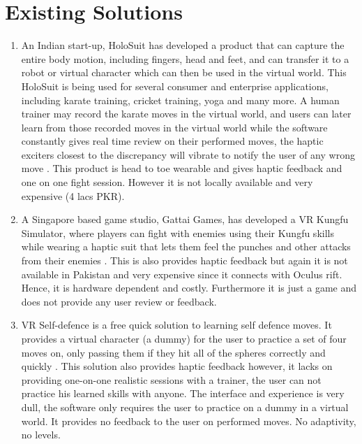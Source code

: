 \section{Existing Solutions}
\label{section:existingSolutions}
\begin{enumerate}
    \item An Indian start-up, HoloSuit has developed a product that can capture the entire body motion, including fingers, head and feet, and can transfer it to a robot or virtual character which can then be used in the virtual world. This HoloSuit is being used for several consumer and enterprise applications, including karate training, cricket training, yoga and many more. A human trainer may record the karate moves in the virtual world, and users can later learn from those recorded moves in the virtual world while the software constantly gives real time review on their performed moves, the haptic exciters closest to the discrepancy will vibrate to notify the user of any wrong move \cite{HoloSuit1}. This product is head to toe wearable and gives haptic feedback and one on one fight session. However it is not locally available and very expensive (4 lacs PKR).
    
    \item A Singapore based game studio, Gattai Games, has developed a VR Kungfu Simulator, where players can fight with enemies using their Kungfu skills while wearing a haptic suit that lets them feel the punches and other attacks from their enemies \cite{gattaiGames}. This is also provides haptic feedback but again it is not available in Pakistan and very expensive since it connects with Oculus rift. Hence, it is hardware dependent and costly. Furthermore it is just a game and does not provide any user review or feedback. 
    
    \item VR Self-defence is a free quick solution to learning self defence moves. It provides a virtual character (a dummy) for the user to practice a set of four moves on, only passing them if they hit all of the spheres correctly and quickly \cite{VRselfdef}. This solution also provides haptic feedback however, it lacks on providing one-on-one realistic sessions with a trainer, the user can not practice his learned skills with anyone. The interface and experience is very dull, the software only requires the user to practice on a dummy in a virtual world. It provides no feedback to the user on performed moves. No adaptivity, no levels.
    

\end{enumerate}
